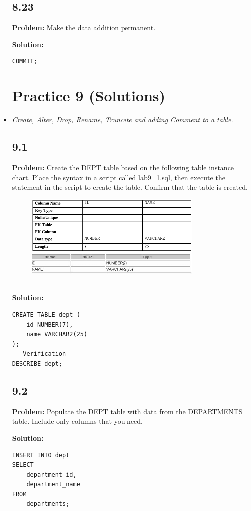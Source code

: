 \documentclass[12pt,a4paper]{article}
\begin{document}
\begin{itemize}
\subsection*{8.23}
\textbf{Problem:} Make the data addition permanent.

\textbf{Solution:}
\begin{lstlisting}
COMMIT;
\end{lstlisting}
\newpage
\section{Practice 9 (Solutions)}
\item \textit{Create, Alter, Drop, Rename, Truncate and adding Comment to a table.} 
\subsection*{9.1}
\textbf{Problem:} Create the DEPT table based on the following table instance chart. Place the syntax in a script called lab9\_1.sql, then execute the statement in the script to create the table. Confirm that the table is created.
\\
\begin{figure}[htbp]
  \centering
  \includegraphics[width=0.8\textwidth]{Screenshots/91.png}
\end{figure}\\
\textbf{Solution:}
\begin{lstlisting}
CREATE TABLE dept ( 
    id NUMBER(7),
    name VARCHAR2(25)
);
-- Verification
DESCRIBE dept;
\end{lstlisting}

\subsection*{9.2}
\textbf{Problem:} Populate the DEPT table with data from the DEPARTMENTS table. Include only columns that you need.

\textbf{Solution:}
\begin{lstlisting}
INSERT INTO dept 
SELECT
    department_id,
    department_name
FROM
    departments;
\end{lstlisting}


\end{itemize}
\end{document}
